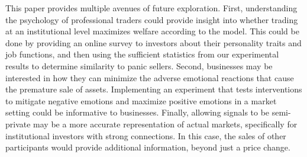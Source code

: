 \documentclass[11pt]{article}
\begin{document}
This paper provides multiple avenues of future exploration. First, understanding the psychology of professional traders could provide insight into whether trading at an institutional level maximizes welfare according to the model. This could be done by providing an online survey to investors about their personality traits and job functions, and then using the sufficient statistics from our experimental results to determine similarity to panic sellers. Second, businesses may be interested in how they can minimize the adverse emotional reactions that cause the premature sale of assets. Implementing an experiment that tests interventions to mitigate negative emotions and maximize positive emotions in a market setting could be informative to businesses. Finally, allowing signals to be semi-private may be a more accurate representation of actual markets, specifically for institutional investors with strong connections. In this case, the sales of other participants would provide additional information, beyond just a price change.




\newpage































% 


\end{document}
